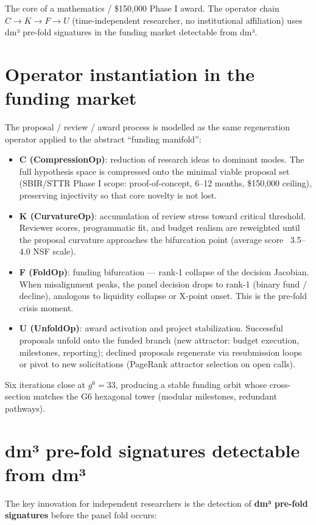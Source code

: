 \documentclass[19pt]{book}
\theoremstyle{plain}
\theoremstyle{definition}
\theoremstyle{remark}
\begin{document}
The core of a mathematics / \$150,000 Phase I award. The operator chain \(C \to K \to F \to U\) (time-independent researcher, no institutional affiliation) uses dm³ pre-fold signatures in the funding market detectable from dm³.

\section{Operator instantiation in the funding market}

The proposal / review / award process is modelled as the same regeneration operator applied to the abstract ``funding manifold'':

\begin{itemize}
\item \textbf{C (CompressionOp)}: reduction of research ideas to dominant modes. The full hypothesis space is compressed onto the minimal viable proposal set (SBIR/STTR Phase I scope: proof-of-concept, 6--12 months, \$150,000 ceiling), preserving injectivity so that core novelty is not lost.
\item \textbf{K (CurvatureOp)}: accumulation of review stress toward critical threshold. Reviewer scores, programmatic fit, and budget realism are reweighted until the proposal curvature approaches the bifurcation point (average score ~3.5--4.0 NSF scale).
\item \textbf{F (FoldOp)}: funding bifurcation — rank-1 collapse of the decision Jacobian. When misalignment peaks, the panel decision drops to rank-1 (binary fund / decline), analogous to liquidity collapse or X-point onset. This is the pre-fold crisis moment.
\item \textbf{U (UnfoldOp)}: award activation and project stabilization. Successful proposals unfold onto the funded branch (new attractor: budget execution, milestones, reporting); declined proposals regenerate via resubmission loops or pivot to new solicitations (PageRank attractor selection on open calls).
\end{itemize}

Six iterations close at \(g^6 = 33\), producing a stable funding orbit whose cross-section matches the G6 hexagonal tower (modular milestones, redundant pathways).

\section{dm³ pre-fold signatures detectable from dm³}

The key innovation for independent researchers is the detection of \textbf{dm³ pre-fold signatures} before the panel fold occurs:
\end{document}
